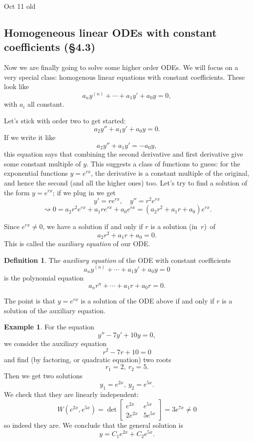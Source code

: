 \documentclass[12pt]{amsart}
\numberwithin{equation}{section}
\theoremstyle{plain} %
\newcommand{\Oct}[1]{Oct #1 old}
\newcommand{\rsa}{\rightsquigarrow}
\theoremstyle{definition}
\newtheorem{defn}[equation]{Definition}
\newtheorem{ex}[equation]{Example}
\theoremstyle{remark}
\begin{document}
\Oct{11}

\subsection*{Homogeneous linear ODEs with constant coefficients (\S4.3)}

Now we are finally going to solve some higher order ODEs. We will focus on a very special class: homogenous linear equations with constant coefficients. These look like
\[ a_n y^{(n)} + \cdots  + a_1 y' + a_0 y = 0,\]
with $a_i$ all constant. 

Let's stick with order two to get started:
\[ a_2 y'' + a_1 y' + a_0 y = 0.\]
If we write it like
\[ a_2 y'' + a_1 y' = -a_0 y,\]
this equation says that combining the second derivative and first derivative give some constant multiple of $y$. This suggests a class of functions to guess: for the exponential functions $y=e^{rx}$, the derivative is a constant multiple of the original, and hence the second (and all the higher ones) too. Let's try to find a solution of the form $y=e^{rx}$; if we plug in we get
\[ y' = r e^{rx}, \quad y'' = r^2 e^{rx}\]
\[\rsa 0 = a_2 r^2 e^{rx}  +a_1 r e^{rx} + a_0 e^{rx} = (a_2 r^2 + a_1 r + a_0) e^{rx}.\]

Since $e^{rx}\neq 0$, we have a solution if and only if $r$ is a solution (in~$r$)~of 
\[a_2 r^2 + a_1 r + a_0 =0.\] This is called the \emph{auxiliary equation} of our ODE.

\begin{defn}
The \emph{auxiliary equation} of the ODE with constant coefficients
 \[ a_n y^{(n)} + \cdots  + a_1 y' + a_0 y = 0\]
 is the polynomial equation
  \[ a_n r^n + \cdots  + a_1 r + a_0 r = 0.\]
\end{defn}

The point is that $y=e^{rx}$ is a solution of the ODE above if and only if $r$ is a solution of the auxiliary equation.

\begin{ex} For the equation
\[ y'' - 7y' + 10y = 0,\]
we consider the auxiliary equation
\[ r^2 - 7r + 10=0\]
and find (by factoring, or quadratic equation) two roots
\[ r_1 = 2, \ r_2 = 5.\]
Then we get two solutions 
\[ y_1 = e^{2x} , \ y_2= e^{5x}.\]
We check that they are linearly independent:
\[ W(e^{2x},e^{5x}) = \det \begin{bmatrix} e^{2x} & e^{5x} \\ 2 e^{2x} & 5 e^{5x} \end{bmatrix} = 3 e^{7x}\neq 0\]
so indeed they are. We conclude that the general solution is
\[ y= C_1 e^{2x} + C_2 e^{5x}.\]
\end{ex}
\end{document}
